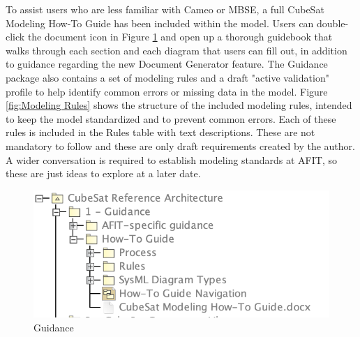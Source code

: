 
To assist users who are less familiar with Cameo or MBSE, a full CubeSat Modeling How-To Guide has been included within the model. Users can double-click the document icon in Figure \ref{fig:Guidance} and open up a thorough guidebook that walks through each section and each diagram that users can fill out, in addition to guidance regarding the new Document Generator feature. The Guidance package also contains a set of modeling rules and a draft "active validation" profile to help identify common errors or missing data in the model. Figure \ref{fig:Modeling Rules} shows the structure of the included modeling rules, intended to keep the model standardized and to prevent common errors. Each of these rules is included in the Rules table with text descriptions. These are not mandatory to follow and these are only draft requirements created by the author. A wider conversation is required to establish modeling standards at AFIT, so these are just ideas to explore at a later date. 

\begin{figure}[H]
    \centering
    \includegraphics[width=4 in]{Thesis/Analysis_and_Results/Analysis and Results Figures/Guidance.png}
    \caption{Guidance}
    \label{fig:Guidance}
\end{figure}


